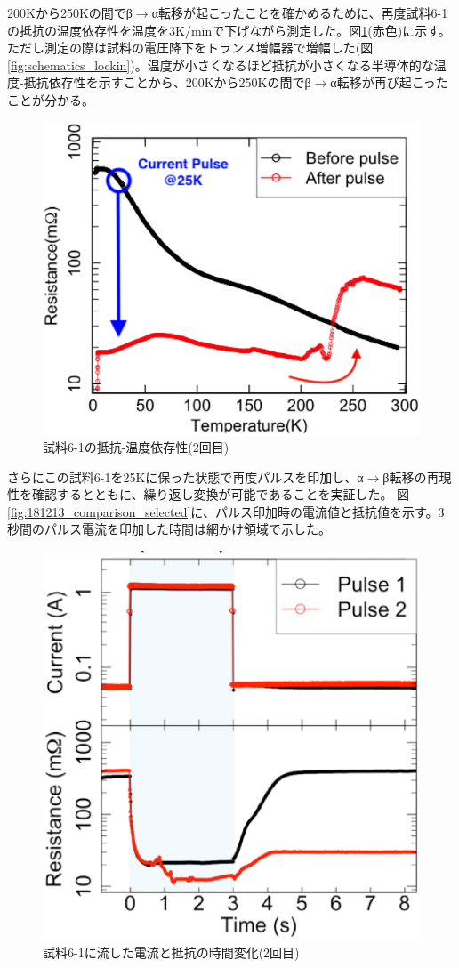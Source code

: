 200Kから250Kの間でβ$\to$α転移が起こったことを確かめるために、再度試料6-1の抵抗の温度依存性を温度を3K/minで下げながら測定した。図\ref{fig:181228_before_after_pulse_log}(赤色)に示す。ただし測定の際は試料の電圧降下をトランス増幅器で増幅した(図\ref{fig:schematics_lockin})。温度が小さくなるほど抵抗が小さくなる半導体的な温度-抵抗依存性を示すことから、200Kから250Kの間でβ$\to$α転移が再び起こったことが分かる。
\begin{figure}[!h]
    \begin{center}
   \includegraphics[width=0.7\hsize]{results_discussions/comparison3.eps}
  \end{center}
  \caption{試料6-1の抵抗-温度依存性(2回目)}
  \label{fig:181228_before_after_pulse_log}
\end{figure}

さらにこの試料6-1を25Kに保った状態で再度パルスを印加し、α$\to$β転移の再現性を確認するとともに、繰り返し変換が可能であることを実証した。
図\ref{fig:181213_comparison_selected}に、パルス印加時の電流値と抵抗値を示す。3秒間のパルス電流を印加した時間は網かけ領域で示した。
\begin{figure}[!h]
    \begin{center}
   \includegraphics[width=0.6\hsize]{results_discussions/TD1.eps}
  \end{center}
  \caption{試料6-1に流した電流と抵抗の時間変化(2回目)}
  \label{fig:181228_current_resistance.eps}
\end{figure}

